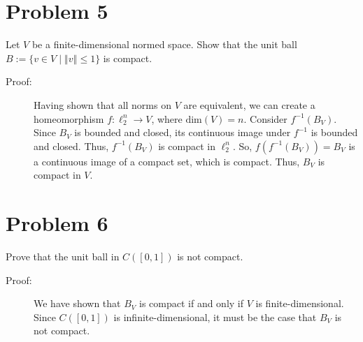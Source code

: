 \documentclass[10pt]{extarticle}
\newcommand{\norm}[1]{\left\Vert #1\right\Vert}
\begin{document}
  \section{Problem 5}%
  Let $V$ be a finite-dimensional normed space. Show that the unit ball $B:= \{v\in V\mid \norm{v} \leq 1\}$ is compact.
  \begin{description}
    \item[Proof:] Having shown that all norms on $V$ are equivalent, we can create a homeomorphism $f: \ell_{2}^{n}\rightarrow V$, where $\text{dim}(V) = n$. Consider $f^{-1}(B_V)$. Since $B_V$ is bounded and closed, its continuous image under $f^{-1}$ is bounded and closed. Thus, $f^{-1}(B_V)$ is compact in $\ell_{2}^{n}$. So, $f(f^{-1}(B_V)) = B_V$ is a continuous image of a compact set, which is compact. Thus, $B_V$ is compact in $V$.
  \end{description}
  \section{Problem 6}%
  Prove that the unit ball in $C([0,1])$ is not compact.
  \begin{description}
    \item[Proof:] We have shown that $B_V$ is compact if and only if $V$ is finite-dimensional. Since $C([0,1])$ is infinite-dimensional, it must be the case that $B_V$ is not compact.
  \end{description}
\end{document}

